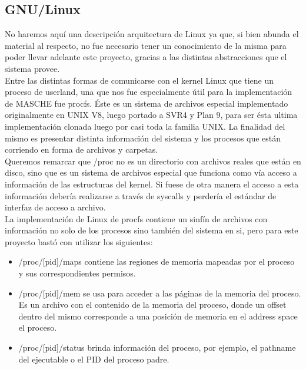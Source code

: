 \subsection{GNU/Linux}

No haremos aquí una descripción arquitectura de Linux ya que, si bien abunda el
material al respecto, no fue necesario tener un conocimiento de la misma para
poder llevar adelante este proyecto, gracias a las distintas abstracciones que
el sistema provee.\\

Entre las distintas formas de comunicarse con el kernel Linux que tiene un
proceso de userland, una que nos fue especialmente útil para la implementación
de MASCHE fue procfs. Éste es un sistema de archivos especial implementado
originalmente en UNIX V8, luego portado a SVR4 y Plan 9, para ser ésta ultima
implementación clonada luego por casi toda la familia UNIX. La finalidad del
mismo es presentar distinta información del sistema y los procesos que están
corriendo en forma de archivos y carpetas.\\

Queremos remarcar que /proc no es un directorio con archivos reales que están
en disco, sino que es un sistema de archivos especial que funciona como vía
acceso a información de las estructuras del kernel. Si fuese de otra manera el
acceso a esta información debería realizarse a través de syscalls y perdería el
estándar de interfaz de acceso a archivo.\\

La implementación de Linux de procfs contiene un sinfín de archivos con
información no solo de los procesos sino también del sistema en si, pero para
este proyecto bastó con utilizar los siguientes:\\

\begin{itemize}

\item /proc/[pid]/maps contiene las regiones de memoria mapeadas por el proceso
    y sus correspondientes permisos.

\item /proc/[pid]/mem se usa para acceder a las páginas de la memoria del
    proceso. Es un archivo con el contenido de la memoria del proceso, donde un
    offset dentro del mismo corresponde a una posición de memoria en el address
    space el proceso.

\item /proc/[pid]/status brinda información del proceso, por ejemplo, el
    pathname del ejecutable o el PID del proceso padre.

\end{itemize}
